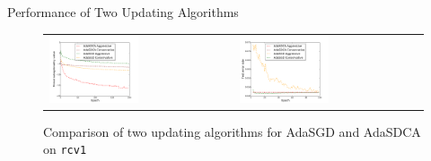 \begin{frame}{Performance of Two Updating Algorithms}
\begin{figure}[htbp]
\begin{tabular}{ll}
    \centering
        \includegraphics[width=0.5\textwidth]{images/two_updates_obej.pdf} &
        \includegraphics[width=0.5\textwidth]{images/two_updates_terror.pdf}
\end{tabular}
    \caption{Comparison of two updating algorithms for AdaSGD and AdaSDCA on \texttt{rcv1}}
    \label{fig:two_updates}
\end{figure}
\end{frame}

